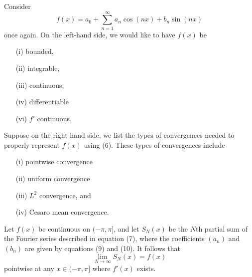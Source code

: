 Consider 
\[  f(x) = a_{0} + \sum_{ n=1 }^{ \infty  } a_{n} \cos(nx) + b_{n} \sin(nx) \] once again.
On the left-hand side, we would like to have \( f(x)  \) be 
\begin{enumerate}
    \item[(i)] bounded,
    \item[(ii)] integrable,
    \item[(iii)] continuous,
    \item[(iv)] differentiable 
    \item[(vi)] \( f'  \) continuous.
\end{enumerate}
Suppose on the right-hand side, we list the types of convergences needed to properly represent \( f(x)  \) using (6). These types of convergences include 
\begin{enumerate}
    \item[(i)] pointwise convergence
    \item[(ii)] uniform convergence
    \item[(iii)] \( L^{2}  \) convergence, and
    \item[(iv)] Cesaro mean convergence.
\end{enumerate}

\begin{theorem}{}{}
    Let \( f(x)  \) be continuous on \( (- \pi , \pi]  \), and let \( S_{N}(x)  \) be the \( N \)th partial sum of the Fourier series described in equation (7), where the coefficients \( (a_{n}) \) and \( (b_{n}) \) are given by equations (9) and (10). It follows that 
    \[  \lim_{ N \to \infty  }  S_{N}(x) = f(x)  \] 
    pointwise at any \( x \in (-\pi, \pi]   \) where \( f'(x)  \) exists.
\end{theorem}

